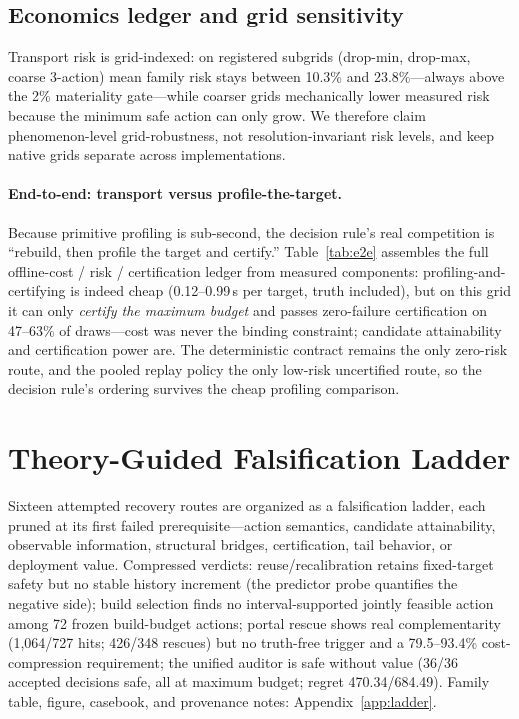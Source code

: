 \documentclass{article}
\begin{document}
\subsection{Economics ledger and grid sensitivity}

Transport risk is grid-indexed: on registered subgrids (drop-min, drop-max, coarse 3-action) mean family
risk stays between 10.3\% and 23.8\%---always above the 2\% materiality gate---while coarser grids
mechanically lower measured risk because the minimum safe action can only grow. We therefore claim
phenomenon-level grid-robustness, not resolution-invariant risk levels, and keep native grids separate
across implementations.

\paragraph{End-to-end: transport versus profile-the-target.}
Because primitive profiling is sub-second, the decision rule's real competition is ``rebuild, then profile
the target and certify.'' Table~\ref{tab:e2e} assembles the full offline-cost / risk / certification
ledger from measured components: profiling-and-certifying is indeed cheap (0.12--0.99\,s per target,
truth included), but on this grid it can only \emph{certify the maximum budget} and passes zero-failure
certification on 47--63\% of draws---cost was never the binding constraint; candidate attainability and
certification power are. The deterministic contract remains the only zero-risk route, and the pooled
replay policy the only low-risk uncertified route, so the decision rule's ordering survives the cheap
profiling comparison.

\section{Theory-Guided Falsification Ladder}
\label{sec:ladder}

Sixteen attempted recovery routes are organized as a falsification ladder, each pruned at its first
failed prerequisite---action semantics, candidate attainability, observable information, structural
bridges, certification, tail behavior, or deployment value. Compressed verdicts: reuse/recalibration
retains fixed-target safety but no stable history increment (the predictor probe quantifies the negative
side); build selection finds no interval-supported jointly feasible action among 72 frozen
build-budget actions; portal rescue shows real complementarity (1{,}064/727 hits; 426/348 rescues) but no
truth-free trigger and a 79.5--93.4\% cost-compression requirement; the unified auditor is safe without
value (36/36 accepted decisions safe, all at maximum budget; regret 470.34/684.49). Family table, figure,
casebook, and provenance notes: Appendix~\ref{app:ladder}.
\end{document}
